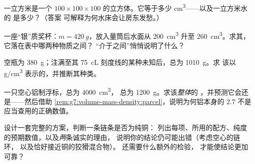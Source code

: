 \begin{exercise}[$\star\star$]\label{exo:g7:volume-mass-density:8}
一立方米是一个 $100 \times 100 \times 100$
的立方体。它等于多少 \unit{cm^3}——以及一立方米水的
是多少？（答案
可解释为何水床会让房东发愁。）
\end{exercise}

\begin{exercise}[$\star\star$]\label{exo:g7:volume-mass-density:9}
一座“银”质奖杯：$m = \qty{420}{g}$，放入量筒后水面从
\qty{200}{cm^3} 升至 \qty{260}{cm^3}。求其，
它落在表中哪两种物质之间？
“介于之间”悄悄说明了什么？
\end{exercise}

\begin{exercise}[$\star\star$]\label{exo:g7:volume-mass-density:10}
空瓶为 \qty{380}{g}；注满至其 \qty{75}{cL}
刻度线的某种未知后，总为 \qty{1010}{g}。求
该以 \unit{g/cm^3} 表示的，并推断其种类。
\end{exercise}

\begin{exercise}[$\star\star$]\label{exo:g7:volume-mass-density:11}
一只空心铝制浮标，总为 \qty{4000}{cm^3}，
总为 \qty{1200}{g}。求该\emph{整体}的
，并预测它会还是——然后借助
\cref{rem:g7:volume-mass-density:parcel}，说明为何铝本身的
$2.7$ 不是应当查用的正确数值。
\end{exercise}

\begin{exercise}[$\star\star\star$]\label{exo:g7:volume-mass-density:12}
设计一套完整的方案，判断一条链条是否为纯铜：
列出每项、所用的配方、纯度的预期数值，以及\emph{两}条诚实的理由，
说明你的结论仍可能出错（考虑空心的链环，
以及恰好接近铜的狡猾混合物）。
还需要什么额外的检验，
才能使结论更加可靠？
\end{exercise}


